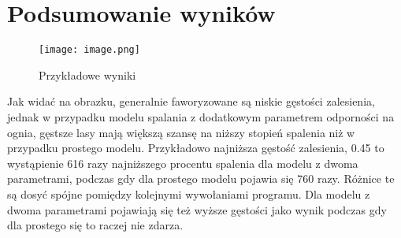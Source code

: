 \documentclass{article}
\begin{document}
\section*{Podsumowanie wyników}

\begin{figure}
    \centering
    \texttt{[image: image.png]}
    \caption{Przykładowe wyniki}
    \label{fig:enter-label}
\end{figure}

Jak widać na obrazku, generalnie faworyzowane są niskie gęstości zalesienia, jednak w przypadku modelu spalania z dodatkowym parametrem odporności na ognia, gęstsze lasy mają większą szansę na niższy stopień spalenia niż w przypadku prostego modelu.
Przykładowo najniższa gęstość zalesienia, 0.45 to wystąpienie 616 razy najniższego procentu spalenia dla modelu z dwoma parametrami, podczas gdy dla prostego modelu pojawia się 760 razy. Różnice te są dosyć spójne pomiędzy kolejnymi wywołaniami programu. Dla modelu z dwoma parametrami pojawiają się też wyższe gęstości jako wynik podczas gdy dla prostego się to raczej nie zdarza.
\end{document}
